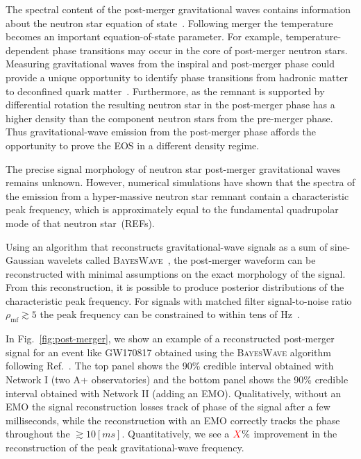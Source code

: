 \documentclass[prx,superscriptaddress,twocolumn,nopreprintnumbers,floatfix,nofootinbib]{revtex4}
\newcommand{\red}[1]{\textcolor{red}{#1}}
\begin{document}
The spectral content of the post-merger gravitational waves contains information about the neutron star equation of state~\cite{takami15}.
Following merger the temperature becomes an important equation-of-state parameter.
For example, temperature-dependent phase transitions may occur in the core of post-merger neutron stars.  Measuring gravitational waves from the inspiral and post-merger phase could provide a unique opportunity to identify phase transitions from hadronic matter to deconfined quark matter~\cite{Bauswein2019}.
Furthermore, as the remnant is supported by differential rotation the resulting neutron star in the post-merger phase has a higher density than the component neutron stars from the pre-merger phase.  Thus gravitational-wave emission from the post-merger phase affords the opportunity to prove the EOS in a different density regime.


The precise signal morphology of neutron star post-merger gravitational waves remains unknown. However, numerical simulations have shown that the spectra of the emission from a hyper-massive neutron star remnant contain a characteristic peak frequency, which is approximately equal to the fundamental quadrupolar mode of that neutron star~(REFs).

Using an algorithm that reconstructs gravitational-wave signals as a sum of sine-Gaussian wavelets called \textsc{BayesWave}~\cite{BayesWave}, the post-merger waveform can be reconstructed with minimal assumptions on the exact morphology of the signal.  From this reconstruction, it is possible to produce posterior distributions of the characteristic peak frequency.
For signals with matched filter signal-to-noise ratio $\rho_\text{mf}\gtrsim5$ the peak frequency can be constrained to within tens of Hz~\cite{Chatziioannou,TorresRivas}.

In Fig.~\ref{fig:post-merger}, we show an example of a reconstructed post-merger signal for an event like GW170817 obtained using the \textsc{BayesWave} algorithm following Ref.~\cite{Chatziioannou}.
The top panel shows the 90\% credible interval obtained with Network I (two A+ observatories) and the bottom panel shows the 90\% credible interval obtained with Network II (adding an EMO).
Qualitatively, without an EMO the signal reconstruction losses track of phase of the signal after a few milliseconds, while the reconstruction with an EMO correctly tracks the phase throughout the $\gtrsim\unit{10}[ms]$.  Quantitatively, we see a $\red{X}\%$ improvement in the reconstruction of the peak gravitational-wave frequency.
\end{document}

